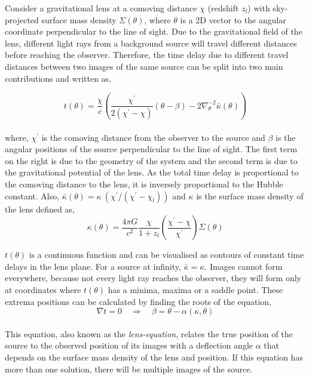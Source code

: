Consider a gravitational lens at a comoving distance $\chi$ (redshift $z_l$) 
with sky-projected surface
mass density $\Sigma(\theta)$, where $\theta$ is a 2D vector to the
angular coordinate perpendicular to the line of sight. Due to the 
gravitational field of the lens, different light rays from a background source
will travel different distances before reaching the observer. Therefore, the time delay
due to different travel distances between two images of the same source can be
split into two main contributions and written as,

\begin{equation}
	t(\theta) = \dfrac{\chi}{c} \left( \dfrac{\chi^{\prime}}{2(\chi^{\prime}-\chi)} 
				(\theta-\beta) 
				- 2\nabla_{\theta}^{-2} \bar{\kappa}(\theta) \right)
	\label{eqn:timedelay}
\end{equation}
\\
where, $\chi^{\prime}$ is the comoving distance from the observer
to the source and $\beta$ is 
the angular positions of the source perpendicular to the line of sight.
The first term on the right is due to the geometry of the system
and the second term is due to the gravitational potential of the lens.
As the total time delay is proportional to the comoving distance
to the lens, it is inversely proportional to the Hubble constant. 
Also, $\bar{\kappa}(\theta) = \kappa\ (\chi^{\prime}/(\chi^{\prime}-\chi_l))$ and
$\kappa$ is the surface mass density of the lens defined as,
\begin{equation}
	\kappa(\theta) = \dfrac{4\pi G}{c^2} \dfrac{\chi}{1+z_l}
					  \left(\dfrac{\chi^{\prime}-\chi}{\chi^{\prime}}\right) \Sigma(\theta)
\end{equation}

$t(\theta)$ is a continuous function and can be visualised as contours
of constant time delays in the lens plane. For a source at infinity,
$\bar{\kappa}=\kappa$.
Images cannot form everywhere, because not every light
ray reaches the observer, they will form only at coordinates where $t(\theta)$
has a minima, maxima or a saddle point. These extrema positions can 
be calculated by finding the roots of the equation,
\begin{equation}
	\nabla t = 0 \quad \Rightarrow \quad \beta = \theta - \alpha(\kappa,\theta)
\end{equation}
\\
This equation, also known as the {\it lens-equation}, relates the true 
position of the source to the observed position of its images with
a deflection angle $\alpha$ that depends on the surface mass density
of the lens and position. If this equation has more than one solution,
there will be multiple images of the source.

